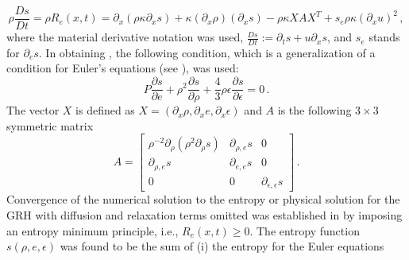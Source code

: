 \documentclass[times,doublespace]{fldauth}%
\begin{document}
\begin{equation} \label{eq:app_entr_eq_non_equil}
\rho \frac{Ds}{Dt} = \rho R_e(x,t) = \partial_x \left( \rho \kappa \partial_x s \right) + \kappa \left(\partial_x \rho\right) \left( \partial_x s\right) - \rho \kappa X A X^T  + s_e \rho \kappa (\partial_x u)^2 \, ,
\end{equation} 
% 
where the material derivative notation was used, $\frac{Ds}{Dt} := \partial_t s + u \partial_x s$, and
$s_e$ stands for $\partial_e s$. 
In obtaining , the following condition, which is a generalization of a condition
for Euler's equations (see \cite{our_jcp_radhy_paper}), was used:
%
\begin{equation} 
\label{eq:visc_reg_assumptions}
P \frac{\partial s}{\partial e} + \rho^2 \frac{\partial s}{\partial \rho} + \frac{4}{3} \rho \epsilon \frac{\partial s}{\partial \epsilon} = 0 \,. 
\end{equation}
%
The vector $X$ is defined as $X=\left( \partial_x \rho, \partial_x e, \partial_x \epsilon \right)$ and $A$ is the 
following $3 \times 3$ symmetric matrix
%
 \begin{equation}\label{eq:mat-quad-form}
 A = 
\begin{bmatrix}
\rho^{-2}\partial_{\rho} \left( \rho^2 \partial_{\rho} s \right) & \partial_{\rho,e} s & 0 \\
 \partial_{\rho,e} s & \partial_{e,e} s & 0 \\
0 & 0 & \partial_{\epsilon,\epsilon} s
\end{bmatrix}
\,.
\end{equation}
%
Convergence of the numerical solution to the entropy or physical solution for the GRH with diffusion and relaxation terms omitted was established in \cite{our_jcp_radhy_paper} by imposing an entropy minimum principle, i.e., $R_e(x,t) \geq 0$. The entropy function $s(\rho,e,\epsilon)$ was found to be the sum of (i) the entropy for the Euler equations 
\end{document}
